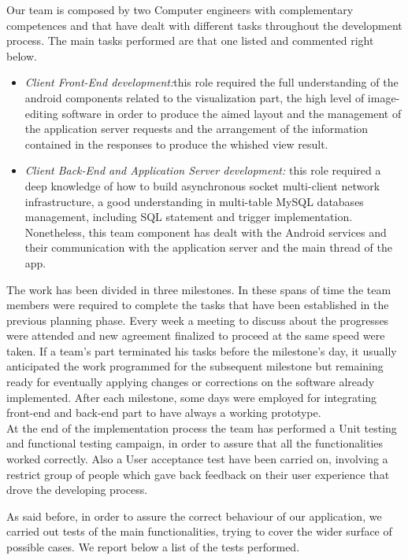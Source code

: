 Our team is composed by two Computer engineers with complementary competences and that have dealt with different tasks throughout the development process. The main tasks performed are that one listed and commented right below.

\begin{itemize}
\item \emph{Client Front-End development:}this role required the full understanding of the android components related to the visualization part, the high level of image-editing software in order to produce the aimed layout and the management of the application server requests and the arrangement of the information contained in the responses to produce the whished view result. 

\item \emph{Client Back-End and Application Server development:} this role required a deep knowledge of how to build asynchronous socket multi-client network infrastructure, a good understanding in multi-table MySQL databases management, including SQL statement and trigger implementation. Nonetheless, this team component has dealt with the Android services and their communication with the application server and the main thread of the app.
\end{itemize}

The work has been divided in three milestones. In these spans of time the team members were required to complete the tasks that have been established in the previous planning phase. Every week a meeting to discuss about the progresses were attended and new agreement finalized to proceed at the same speed were taken. If a team’s part terminated his tasks before the milestone’s day, it usually anticipated the work programmed for the subsequent milestone but remaining ready for eventually applying changes or corrections on the software already implemented. After each milestone, some days were employed for integrating front-end and back-end part to have always a working prototype. \\
At the end of the implementation process the team has performed a Unit testing and functional testing campaign, in order to assure that all the functionalities worked correctly. Also a User acceptance test have been carried on, involving a restrict group of people which gave back feedback on their user experience that drove the developing process.

As said before, in order to assure the correct behaviour of our application, we carried out tests of the main functionalities, trying to cover the wider surface of possible cases. We report below a list of the tests performed.

